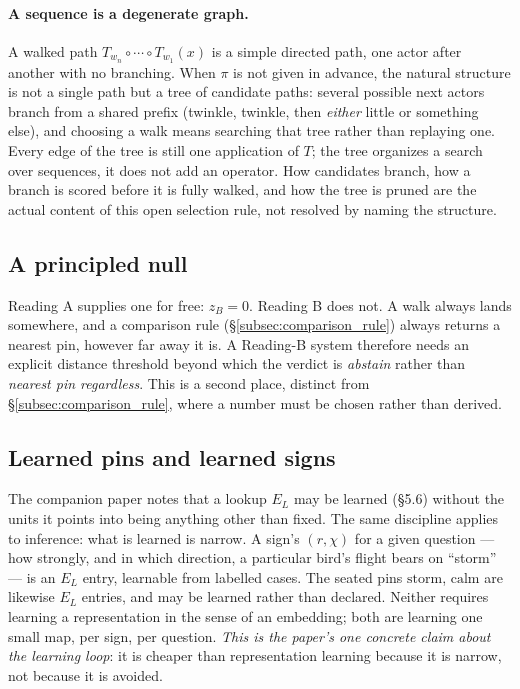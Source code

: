 \documentclass[12pt, a4paper]{article}
\begin{document}
\paragraph{A sequence is a degenerate graph.} A walked path
$T_{w_n}\circ\cdots\circ T_{w_1}(x)$ is a simple directed path, one
actor after another with no branching. When $\pi$ is not given in
advance, the natural structure is not a single path but a tree of
candidate paths: several possible next actors branch from a shared
prefix (twinkle, twinkle, then \emph{either} little or something
else), and choosing a walk means searching that tree rather than
replaying one. Every edge of the tree is still one application of
$T$; the tree organizes a search over sequences, it does not add an
operator. How candidates branch, how a branch is scored before it is
fully walked, and how the tree is pruned are the actual content of
this open selection rule, not resolved by naming the structure.

\subsection{A principled null}
\label{subsec:the_null}
Reading A supplies one for free: $z_B=0$. Reading B does not. A walk
always lands somewhere, and a comparison rule (\S\ref{subsec:comparison_rule})
always returns a nearest pin, however far away it is. A Reading-B
system therefore needs an explicit distance threshold beyond which the
verdict is \emph{abstain} rather than \emph{nearest pin regardless}.
This is a second place, distinct from \S\ref{subsec:comparison_rule},
where a number must be chosen rather than derived.

\subsection{Learned pins and learned signs}
\label{subsec:learned_pins}
The companion paper notes that a lookup $E_L$ may be learned
(\S5.6) without the units it points into being anything other than
fixed. The same discipline applies to inference: what is learned is
narrow. A sign's $(r,\chi)$ for a given question --- how strongly, and
in which direction, a particular bird's flight bears on ``storm'' ---
is an $E_L$ entry, learnable from labelled cases. The seated pins
$\mathrm{storm}$, $\mathrm{calm}$ are likewise $E_L$ entries, and may
be learned rather than declared. Neither requires learning a
representation in the sense of an embedding; both are learning one
small map, per sign, per question. \emph{This is the paper's one
concrete claim about the learning loop}: it is cheaper than
representation learning because it is narrow, not because it is
avoided.
\end{document}

